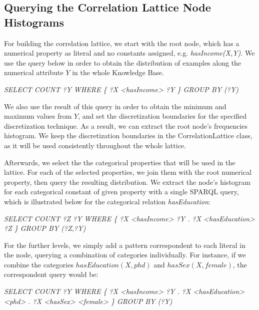 \subsection{Querying the Correlation Lattice Node Histograms}

For building the correlation lattice, we start with the root node, which has a numerical property as literal and no
constants assigned, e.g. \emph{hasIncome(X,Y)}. We use the query below in order to obtain the  distribution of 
examples along the numerical attribute $Y$ in the whole Knowledge Base.

\begin{center}
 \emph{SELECT COUNT ?Y WHERE \{ ?X <hasIncome> ?Y \} GROUP BY (?Y)}
\end{center}

We also use the result of this query in order to obtain the minimum and maximum values from $Y$, and set the
discretization boundaries for the specified discretization technique. As a result, we can extract the root
node's frequencies histogram. We keep the discretization boundaries in the CorrelationLattice class, as it will be used
consistently throughout the whole lattice.

Afterwards, we select the the categorical properties that will be used in the lattice. For each of the selected
properties, we join them with the root numerical property, then query the resulting distribution. We extract the node's
histogram for each categorical constant of given property with a single SPARQL query, which is illustrated below for the
categorical relation \emph{hasEducation}:

\begin{center}
 \emph{SELECT COUNT ?Z ?Y WHERE \{ ?X <hasIncome> ?Y . ?X <hasEducation> ?Z \} GROUP BY (?Z,?Y)}
\end{center}

For the further levels, we simply add a pattern correspondent to each literal in the node, querying a combination of
categories individually. For instance, if we combine the categories $hasEducation(X,phd)$ and $hasSex(X,female)$, the
correspondent query would be:

\begin{center}
 \emph{SELECT COUNT ?Y WHERE \{ ?X <hasIncome> ?Y . ?X <hasEducation> <phd> . ?X <hasSex> <female> \} GROUP BY (?Y)}
\end{center}




% 



